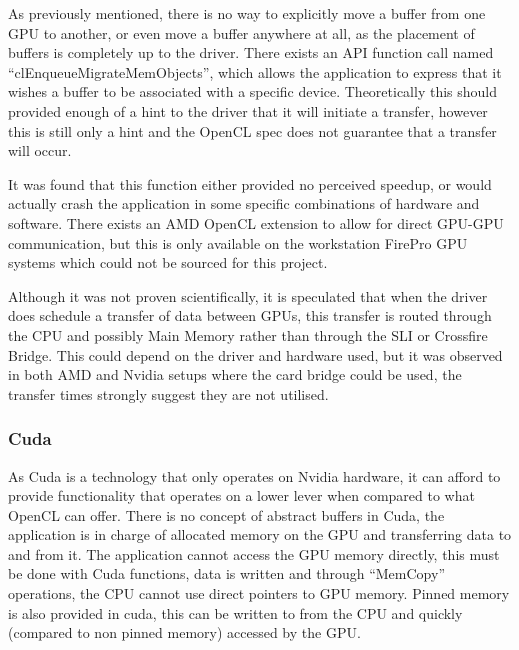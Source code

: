 \documentclass[12pt,a4paper]{article}
\begin{document}
As previously mentioned, there is no way to explicitly move a buffer from one GPU to another, or even move a buffer anywhere at all, as the placement of buffers is completely up to the driver. There exists an API function call named “clEnqueueMigrateMemObjects”, which allows the application to express that it wishes a buffer to be associated with a specific device. Theoretically this should provided enough of  a hint to the driver that it will initiate a transfer, however this is still only a hint and the OpenCL spec does not guarantee that a transfer will occur.

It was found that this function either provided no perceived speedup, or would actually crash the application in some specific combinations of hardware and software. There exists an AMD OpenCL extension to allow for direct GPU-GPU communication, but this is only available on the workstation FirePro GPU systems which could not be sourced for this project.

Although it was not proven scientifically, it is speculated that when the driver does schedule a transfer of data between GPUs, this transfer is routed through the CPU and possibly Main Memory rather than through the SLI or Crossfire Bridge. This could depend on the driver and hardware used, but it was observed in both AMD and Nvidia setups where the card bridge could be used, the transfer times strongly suggest they are not utilised.

\subsubsection{Cuda}
As Cuda is a technology that only operates on Nvidia hardware, it can afford to provide functionality that operates on a lower lever when compared to what OpenCL can offer. There is no concept of abstract buffers in Cuda, the application is in charge of allocated memory on the GPU and transferring data to and from it. The application cannot access the GPU memory directly, this must be done with Cuda functions, data is written and through “MemCopy” operations, the CPU cannot use direct pointers to GPU memory. Pinned memory is also provided in cuda, this can be written to from the CPU and quickly (compared to non pinned memory) accessed by the GPU.
\end{document}
